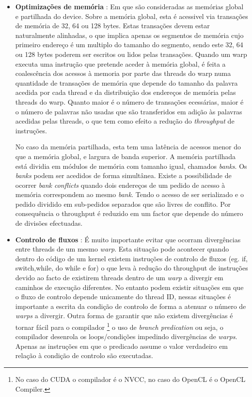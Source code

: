 \begin{itemize}
\item {\textbf{Optimizações de memória}} : Em que são consideradas as memórias global e partilhada do device.
Sobre a memória global, esta é acessivel via transações de memória de 32, 64 ou 128 bytes. Estas transações devem estar naturalmente alinhadas, o que implica apenas os segmentos de memória cujo primeiro endereço é um multiplo do tamanho do segmento, sendo este 32, 64 ou 128 bytes poderem ser escritos ou lidos pelas transações.
 Quando um warp executa uma instrução que pretende aceder à memória global, é feita a coalescência dos acessos à memoria por parte das threads do warp numa quantidade de transações de memória que depende do tamanho da palavra acedida por cada thread e da distribuição dos endereços de memória pelas threads do warp. Quanto maior é o número de transações ecessárias, maior é o número de palavras não usadas que são transferidos em adição às palavras acedidas pelas threads, o que tem como efeito a redução do \textit{throughput} de instruções\cite{cpg}. \par

No caso da memória partilhada, esta tem uma latência de acessos menor do que a memória global, e largura de banda superior. A memória partilhada está dividia em módulos de memória com tamanho igual, chamados \textit{banks}. Os \textit{banks} podem ser acedidos de forma simultânea. Existe a possibilidade de ocorrer \textit{bank conflicts} quando dois endereços de um pedido de acesso à memória correspondem ao mesmo \textit{bank}.  Tendo o acesso de ser serializado e o pedido dividido em sub-pedidos separados que são livres de conflito. Por consequência o throughput é reduzido em um factor que depende do número de divisões efectuadas.

\item{\textbf{Controlo de fluxos}} : É muito importante evitar que ocorram divergências entre threads de um mesmo \textit{warp}. Esta situação pode acontecer quando dentro do código de um kernel existem instruções de controlo de fluxos (eg. if, switch,while, do while e for) o que leva à redução do throughput de instruções devido ao facto de existirem threads dentro de um \textit{warp} a divergir em caminhos de execução diferentes. No entanto podem existir situações em que o fluxo de controlo depende unicamente do thread ID, nessas situações é importante a escrita da condição de controlo de forma a atenuar o número de \textit{warps} a divergir. Outra forma de garantir que não existem divergências é tornar fácil para o compilador \footnote[4]{ No caso do CUDA o compilador é o NVCC, no caso do OpenCL é o OpenCL Compiler.} o uso de \textit{branch predication} ou seja, o compilador desenrola os loops/condições impedindo divergências de \textit{warps}. Apenas as instruções em que o predicado assume o valor verdadeiro em relação à condição de controlo são executadas.
\end{itemize}


